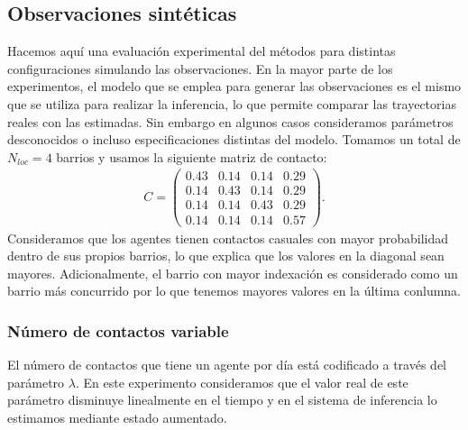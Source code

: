 \subsection{Observaciones sintéticas}

Hacemos aquí una evaluación experimental del métodos para distintas configuraciones simulando las observaciones. En la mayor parte de los experimentos, el modelo que se emplea para generar las observaciones es el mismo que se utiliza para realizar la inferencia, lo que permite comparar las trayectorias reales con las estimadas. Sin embargo en algunos casos consideramos parámetros desconocidos o incluso especificaciones distintas del modelo. Tomamos un total de $N_{loc} = 4$ barrios y usamos la siguiente matriz de contacto:
\begin{align*}
    C = 
    \begin{pmatrix}
        0.43 & 0.14 & 0.14 & 0.29 \\
        0.14 & 0.43 & 0.14 & 0.29 \\
        0.14 & 0.14 & 0.43 & 0.29 \\
        0.14 & 0.14 & 0.14 & 0.57 
    \end{pmatrix}.
\end{align*}
Consideramos que los agentes tienen contactos casuales con mayor probabilidad dentro de sus propios barrios, lo que explica que los valores en la diagonal sean mayores. Adicionalmente, el barrio con mayor indexación es considerado como un barrio más concurrido por lo que tenemos mayores valores en la última conlumna.

\subsubsection{Número de contactos variable}

El número de contactos que tiene un agente por día está codificado a través del parámetro $\lambda$. En este experimento consideramos que el valor real de este parámetro disminuye linealmente en el tiempo y en el sistema de inferencia lo estimamos mediante estado aumentado.

